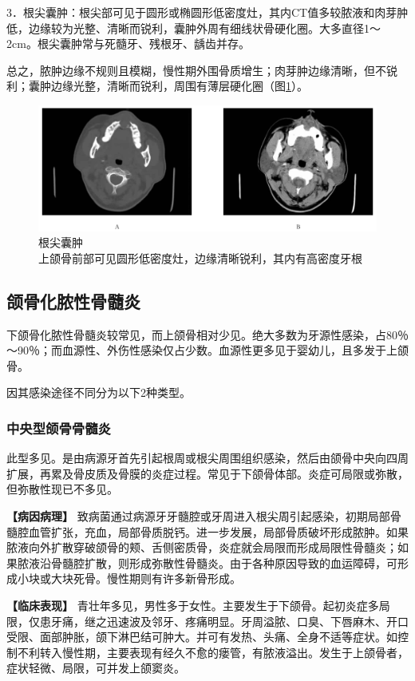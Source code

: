 3．根尖囊肿：根尖部可见于圆形或椭圆形低密度灶，其内CT值多较脓液和肉芽肿低，边缘较为光整、清晰而锐利，囊肿外周有细线状骨硬化圈。大多直径1～2cm。根尖囊肿常与死髓牙、残根牙、龋齿并存。

总之，脓肿边缘不规则且模糊，慢性期外围骨质增生；肉芽肿边缘清晰，但不锐利；囊肿边缘光整，清晰而锐利，周围有薄层硬化圈（图\ref{fig7-1}）。

\begin{figure}[!htbp]
 \centering
 \includegraphics[width=.7\textwidth,height=\textheight,keepaspectratio]{./images/Image00154.jpg}
 \captionsetup{justification=centering}
 \caption{根尖囊肿\\{\small 上颌骨前部可见圆形低密度灶，边缘清晰锐利，其内有高密度牙根}}
 \label{fig7-1}
  \end{figure} 

\subsection{颌骨化脓性骨髓炎}

下颌骨化脓性骨髓炎较常见，而上颌骨相对少见。绝大多数为牙源性感染，占80％～90％；而血源性、外伤性感染仅占少数。血源性更多见于婴幼儿，且多发于上颌骨。

因其感染途径不同分为以下2种类型。

\subsubsection{中央型颌骨骨髓炎}

此型多见。是由病源牙首先引起根周或根尖周围组织感染，然后由颌骨中央向四周扩展，再累及骨皮质及骨膜的炎症过程。常见于下颌骨体部。炎症可局限或弥散，但弥散性现已不多见。

\textbf{【病因病理】}
致病菌通过病源牙牙髓腔或牙周进入根尖周引起感染，初期局部骨髓腔血管扩张，充血，局部骨质脱钙。进一步发展，局部骨质破坏形成脓肿。如果脓液向外扩散穿破颌骨的颊、舌侧密质骨，炎症就会局限而形成局限性骨髓炎；如果脓液沿骨髓腔扩散，则形成弥散性骨髓炎。由于各种原因导致的血运障碍，可形成小块或大块死骨。慢性期则有许多新骨形成。

\textbf{【临床表现】}
青壮年多见，男性多于女性。主要发生于下颌骨。起初炎症多局限，仅患牙痛，继之迅速波及邻牙、疼痛明显。牙周溢脓、口臭、下唇麻木、开口受限、面部肿胀，颌下淋巴结可肿大。并可有发热、头痛、全身不适等症状。如控制不利转入慢性期，主要表现有经久不愈的瘘管，有脓液溢出。发生于上颌骨者，症状轻微、局限，可并发上颌窦炎。

